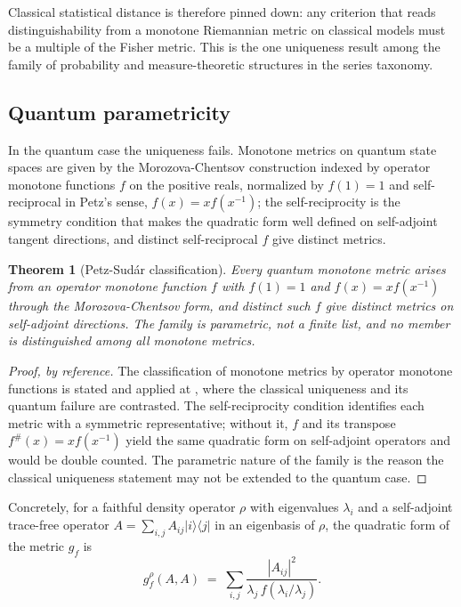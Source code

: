 \documentclass[11pt,letterpaper]{article}
\newtheorem{theorem}{Theorem}[section]
\theoremstyle{definition}
\theoremstyle{remark}
\begin{document}
Classical statistical distance is therefore pinned down: any criterion that reads distinguishability from a monotone Riemannian metric on classical models must be a multiple of the Fisher metric. This is the one uniqueness result among the family of probability and measure-theoretic structures in the series taxonomy.

\subsection{Quantum parametricity}

In the quantum case the uniqueness fails. Monotone metrics on quantum state spaces are given by the Morozova-Chentsov construction indexed by operator monotone functions $f$ on the positive reals, normalized by $f(1) = 1$ and self-reciprocal in Petz's sense, $f(x) = x f(x^{-1})$; the self-reciprocity is the symmetry condition that makes the quadratic form well defined on self-adjoint tangent directions, and distinct self-reciprocal $f$ give distinct metrics.

\begin{theorem}[Petz-Sud{\'a}r classification]
\label{thm:petzsudar}
Every quantum monotone metric arises from an operator monotone function $f$ with $f(1) = 1$ and $f(x) = x f(x^{-1})$ through the Morozova-Chentsov form, and distinct such $f$ give distinct metrics on self-adjoint directions. The family is parametric, not a finite list, and no member is distinguished among all monotone metrics.
\end{theorem}

\begin{proof}[Proof, by reference]
The classification of monotone metrics by operator monotone functions is stated and applied at \cite{b8}, where the classical uniqueness and its quantum failure are contrasted. The self-reciprocity condition identifies each metric with a symmetric representative; without it, $f$ and its transpose $f^{\#}(x) = x f(x^{-1})$ yield the same quadratic form on self-adjoint operators and would be double counted. The parametric nature of the family is the reason the classical uniqueness statement may not be extended to the quantum case.
\end{proof}

Concretely, for a faithful density operator $\rho$ with eigenvalues $\lambda_i$ and a self-adjoint trace-free operator $A = \sum_{i,j} A_{ij} |i\rangle\langle j|$ in an eigenbasis of $\rho$, the quadratic form of the metric $g_f$ is
\[
g_f^{\rho}(A, A) \;=\; \sum_{i,j} \frac{|A_{ij}|^2}{\lambda_j \, f(\lambda_i / \lambda_j)}.
\]
\end{document}
